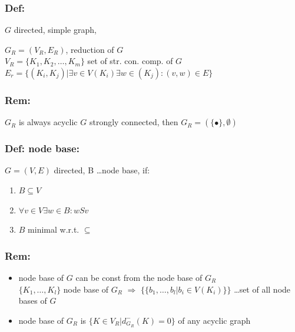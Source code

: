 \subsubsection*{Def:}
$G$ directed, simple graph, 


$G_R = (V_R, E_R)$, reduction of $G$ \\
$V_R = \{K_1, K_2, \ldots , K_m\}$ set of str. con. comp. of $G$ \\
$E_r = \{ (K_i, K_j) | \exists v \in V(K_i) \exists w \in (K_j) : (v,w) \in E \}$

\subsubsection*{Rem:}
$G_R$ is always acyclic
$G$ strongly connected, then $G_R = ( \{ \bullet \}, \emptyset )$

\subsubsection*{Def: node base:}
$G=(V,E) $ directed, B \ldots node base, if:
\begin{enumerate}
\item $B \subseteq V$ 
\item $\forall v \in V \exists w \in B : wSv$
\item $B$ minimal w.r.t. $\subseteq$
\end{enumerate}

\subsubsection*{Rem: }
\begin{itemize}
\item node base of $G$ can be const from the node base of $G_R$ \\
	$\{K_1, \ldots , K_l\} $ node base of $G_R$ $\Rightarrow$ 
	$\{\{b_1, \ldots , b_l | b_i \in V(K_i)\}\}$ \ldots set of all node bases of $G$

\item node base of $G_R$ is $\{K \in V_R | d_{G_R}^{-}(K) = 0 \}$ of any acyclic graph
\end{itemize}

